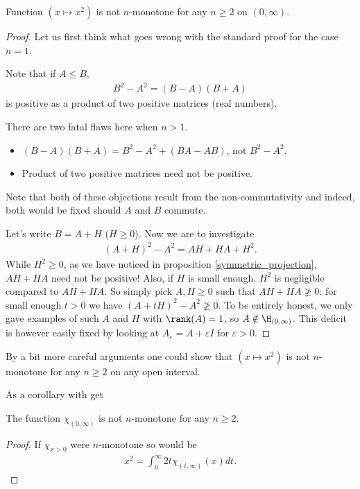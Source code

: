 \begin{prop}
	Function $(x \mapsto x^2)$ is not $n$-monotone for any $n \geq 2$ on $(0, \infty)$.
\end{prop}
\begin{proof}
	Let us first think what goes wrong with the standard proof for the case $n = 1$.

	Note that if $A \leq B$,
	\begin{align*}
		B^2 - A^2 = (B - A) (B + A)
	\end{align*}
	is positive as a product of two positive matrices (real numbers).

	There are two fatal flaws here when $n > 1$.
	\begin{itemize}
		\item $(B - A) (B + A) = B^2-A^2 + (B A - A B)$, not $B^2 - A^2$.
		\item Product of two positive matrices need not be positive.
	\end{itemize}
	Note that both of these objections result from the non-commutativity and indeed, both would be fixed should $A$ and $B$ commute.

	Let's write $B = A + H$ ($H \geq 0$). Now we are to investigate
	\begin{align*}
		(A + H)^2-A^2 = A H + H A + H^2.
	\end{align*}
	While $H^2 \geq 0$, as we have noticed in proposition \ref{symmetric_projection}, $A H + H A$ need not be positive! Also, if $H$ is small enough, $H^2$ is negligible compared to $AH + HA$. So simply pick $A, H \geq 0$ such that $A H + H A \not\geq 0$: for small enough $t > 0$ we have $(A + t H)^2 - A^2 \not\geq 0$. To be entirely honest, we only gave examples of such $A$ and $H$ with $\rank(A) = 1$, so $A \notin \H_{(0, \infty)}$. This deficit is however easily fixed by looking at $A_{\varepsilon} = A + \varepsilon I$ for $\varepsilon > 0$.
\end{proof}

By a bit more careful arguments one could show that $(x \mapsto x^2)$ is not $n$-monotone for any $n \geq 2$ on any open interval.

As a corollary with get

\begin{kor}\label{chimon}
	The function $\chi_{(0, \infty)}$ is not $n$-monotone for any $n \geq 2$.
\end{kor}

\begin{proof}
	If $\chi_{x > 0}$ were $n$-monotone so would be
	\begin{align*}
		x^2 = \int_{0}^{\infty} 2 t \chi_{(t, \infty)}(x) dt.
	\end{align*}
\end{proof}

